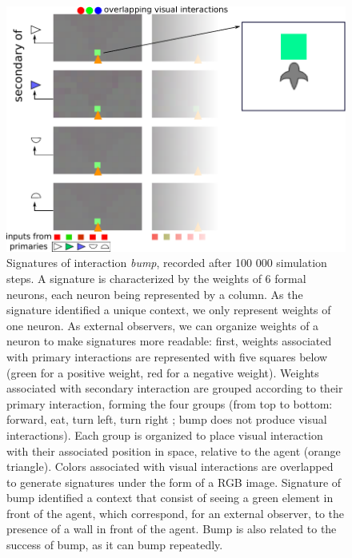 \documentclass[conference]{IEEEtran}
\begin{document}
\begin{figure}[ht]
\centerline{\includegraphics[scale=0.35]{img/Signatures1_5.pdf}}
\caption{Signatures of interaction \textit{bump}, recorded after 100 000 simulation steps. A signature is characterized by the weights of 6 formal neurons, each neuron being represented by a column. As the signature identified a unique context, we only represent weights of one neuron. As external observers, we can organize weights of a neuron to make signatures more readable: first, weights associated with primary interactions are represented with five squares below (green for a positive weight, red for a negative weight). Weights associated with secondary interaction are grouped according to their primary interaction, forming the four groups (from top to bottom: forward, eat, turn left, turn right ; bump does not produce visual interactions). Each group is organized to place visual interaction with their associated position in space, relative to the agent (orange triangle). Colors associated with visual interactions are overlapped to generate signatures under the form of a RGB image. Signature of bump identified a context that consist of seeing a green element in front of the agent, which correspond, for an external observer, to the presence of a wall in front of the agent. Bump is also related to the success of bump, as it can bump repeatedly. %
}
\label{fig:bump}
\end{figure}


\end{document}
